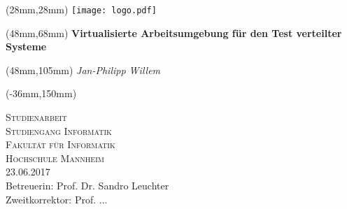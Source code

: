 %
% 
%
 
\begin{titlepage}
\begin{textblock*}{130mm}(28mm,28mm) %
  {\texttt{[image: logo.pdf]}}
\end{textblock*}%
\begin{textblock*}{130mm}(48mm,68mm) %
	\centering\huge\bfseries
	Virtualisierte Arbeitsumgebung für den Test verteilter Systeme
\end{textblock*}%

\begin{textblock*}{130mm}(48mm,105mm)
	\centering\Large\itshape 
	Jan-Philipp Willem
\end{textblock*}

\begin{textblock*}{297mm}(-36mm,150mm) %
	\begin{center}
		{\scshape\Large Studienarbeit\\ Studiengang Informatik}\\
		\vspace{2cm}
		{\scshape\large Fakultät für Informatik\\Hochschule Mannheim}\\
		\vspace{2cm}
		{\large 23.06.2017} \\ %
		\vspace{3,5cm}
		{\large Betreuerin: Prof. Dr. Sandro Leuchter\\
		Zweitkorrektor: Prof. ...}
	\end{center}
\end{textblock*}
\end{titlepage}
\null
\newpage

